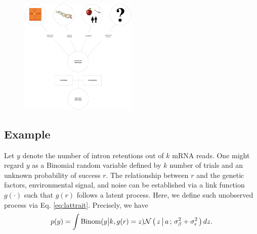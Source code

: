 \begin{figure}[ht]\label{fig:gm}
  \centering
  \includegraphics[width=0.5\textwidth]{images/friendly-model.png}
\end{figure}

\subsection{Example}

Let $y$ denote the number of intron retentions out of $k$ mRNA reads.
One might regard $y$ as a Binomial random variable defined by $k$ number of
trials and an unknown probability of success $r$.
The relationship between $r$ and the genetic factors, environmental signal,
and noise can be established via a link function $g(\cdot)$ such that
$g(r)$ follows a latent process.
Here, we define such unobserved process via Eq. \eqref{eq:lattrait}.
Precisely, we have
\begin{align*}
  p(y) = \int \text{Binom}( {y} \big| {k}, {g(r) = z} ) \mathcal{N}\left(\, { {z} \, \big| \, {a} } \,;\, { {\sigma^2_\beta + \sigma^2_\epsilon} } \,\right) dz.
\end{align*}
